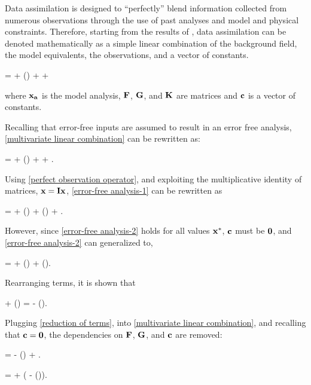 Data assimilation is designed to ``perfectly'' blend information collected from numerous observations through the use of past analyses and model and physical constraints. Therefore, starting from the results of \cite{bergthorsson1955numerical}, data assimilation can be denoted mathematically as a simple linear combination of the background field, the model equivalents, the observations, and a vector of constants.


\be
    \label{multivariate linear combination}
     =  + () +  + 
\ee


\noindent where $\mathbf{x_a}$ is the model analysis, $\mathbf{F}$, $\mathbf{G}$, and $\mathbf{K}$ are matrices and $\mathbf{c}$ is a vector of constants.


Recalling that error-free inputs are assumed to result in an error free analysis, \ref{multivariate linear combination} can be rewritten as:


\be
    \label{error-free analysis-1}
     =  + () +  + .
\ee


\noindent Using \ref{perfect observation operator}, and exploiting the multiplicative identity of matrices, $\mathbf{x} = \mathbf{Ix}$, \ref{error-free analysis-1} can be rewritten as


\be
    \label{error-free analysis-2}
     =  + () + () + .
\ee


\noindent However, since \ref{error-free analysis-2} holds for all values $\mathbf{x^*}$, $\mathbf{c}$ must be $\mathbf{0}$, and \ref{error-free analysis-2} can generalized to,


\be
    \label{error-free analysis-3}
     =  + (\cdot) + (\cdot).
\ee


\noindent Rearranging terms, it is shown that


\be
    \label{reduction of terms}
     + (\cdot) =  - (\cdot).
\ee


\noindent Plugging \ref{reduction of terms}, into \ref{multivariate linear combination}, and recalling that $\mathbf{c} = \mathbf{0}$, the dependencies on $\mathbf{F}$, $\mathbf{G}$, and $\mathbf{c}$ are removed:


\be
    \label{expanded analysis equation}
     =  - () + .
\ee


\be
    \label{full analysis equation}
     =  + ( - ()).
\ee


